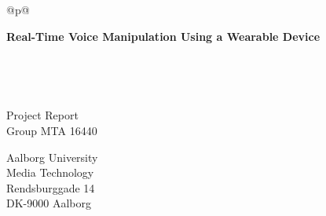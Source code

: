 %
\begin{titlepage}
  \addtolength{\hoffset}{0.5\evensidemargin-0.5\oddsidemargin} %
  \noindent%
  \begin{tabular}{@{}p{\textwidth}@{}}
    \toprule[2pt]
    \midrule
    \vspace{0.2cm}
    \begin{center}
    \Huge{\textbf{
      Real-Time Voice Manipulation Using a Wearable Device%
    }}
    \end{center}
    \vspace{0.2cm}\\
    \midrule
    \toprule[2pt]
  \end{tabular}
  \vspace{1 cm}

  \begin{center}  
  \begin{minipage}{\linewidth}%
	\end{minipage}\\
	\vspace{1 cm}
  

    {\large
      Project Report%
    }\\
    \vspace{0.2cm}
    {\Large
      Group MTA 16440%
    }
  \end{center}
  \begin{center}
  Aalborg University\\
  Media Technology\\
  Rendsburggade 14\\
  DK-9000 Aalborg
  \end{center}
\end{titlepage}
\clearpage
